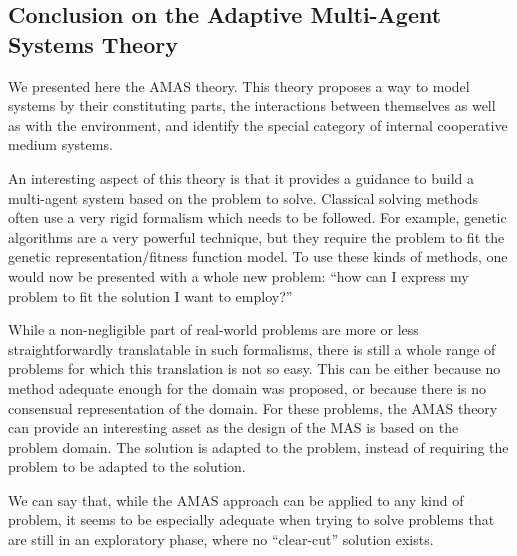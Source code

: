 \subsection{Conclusion on the Adaptive Multi-Agent Systems Theory}

We presented here the AMAS theory. This theory proposes a way to model systems by their constituting parts, the interactions between themselves as well as with the environment, and identify the special category of internal cooperative medium systems.

An interesting aspect of this theory is that it provides a guidance to build a multi-agent system based on the problem to solve. Classical solving methods often use a very rigid formalism which needs to be followed. For example, genetic algorithms are a very powerful technique, but they require the problem to fit the genetic representation/fitness function model. To use these kinds of methods, one would now be presented with a whole new problem: \enquote{how can I express my problem to fit the solution I want to employ?}

While a non-negligible part of real-world problems are more or less straightforwardly translatable in such formalisms, there is still a whole range of problems for which this translation is not so easy. This can be either because no method adequate enough for the domain was proposed, or because there is no consensual representation of the domain. For these problems, the AMAS theory can provide an interesting asset as the design of the MAS is based on the problem domain. The solution is adapted to the problem, instead of requiring the problem to be adapted to the solution.

We can say that, while the AMAS approach can be applied to any kind of problem, it seems to be especially adequate when trying to solve problems that are still in an exploratory phase, where no \enquote{clear-cut} solution exists.
